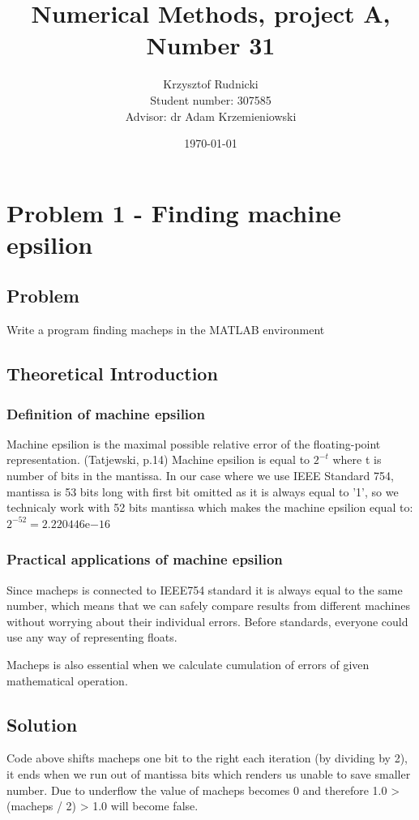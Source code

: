 \documentclass[12pt]{report}
\title{Numerical Methods, project A, Number 31}
\author{Krzysztof Rudnicki\\ Student number: 307585 \\ Advisor: dr Adam Krzemieniowski}
\date{\today}
\begin{document}
\maketitle
\tableofcontents

\chapter{Problem 1 - Finding machine epsilion}

\section{Problem}
Write a program finding macheps in the MATLAB environment
\section{Theoretical Introduction}
\subsection{Definition of machine epsilion}
Machine epsilion is the maximal possible relative error of the floating-point representation. (Tatjewski, p.14)
Machine epsilion is equal to $2^{-t}$ where t is number of bits in the mantissa.
In our case where we use IEEE Standard 754, mantissa is 53 bits long with first bit omitted as it is always equal to '1', so we technicaly work with 52 bits mantissa which makes the machine epsilion equal to: $2^{-52} = 2.220446\mathrm{e}{-16}$

\newpage
\subsection{Practical applications of machine epsilion}
Since macheps is connected to IEEE754 standard it is always equal to the same number, which means that we can safely compare results from different machines without worrying about their individual errors. Before standards, everyone could use any way of representing floats.

Macheps is also essential when we calculate cumulation of errors of given mathematical operation.

\newpage
\section{Solution}


Code above shifts macheps one bit to the right each iteration (by dividing by 2), it ends when we run out of mantissa bits which renders us unable to save smaller number. Due to underflow the value of macheps becomes 0 and therefore 1.0 > (macheps / 2) > 1.0 will become false.
\newpage
\end{document}

